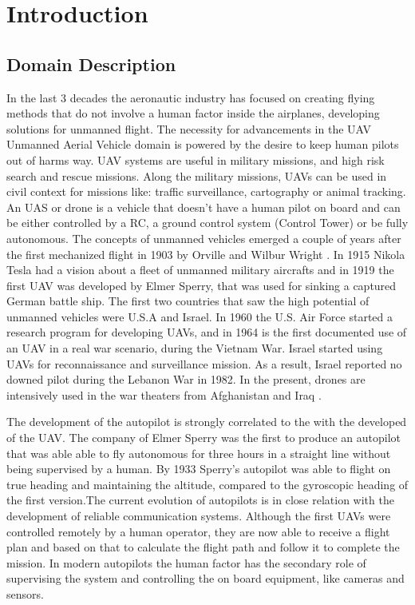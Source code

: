 \chapter{Introduction}
\label{chapter:intro}

\section{Domain Description}
\label{sec:domain}
In the last 3 decades the aeronautic industry has focused on creating flying methods 
that do not involve a human factor inside the airplanes, developing
solutions for unmanned flight. The necessity for advancements in the UAV
{Unmanned Aerial Vehicle} domain is powered by the desire to keep human pilots 
out of harms way. UAV systems are useful in military missions, and high risk 
search and rescue missions. Along the military missions, UAVs can be used in 
civil context for missions like: traffic surveillance, cartography or animal 
tracking. An UAS or drone is a vehicle that doesn't have
a human pilot on board and can be either controlled by a RC, 
a ground control system (Control Tower) or be fully autonomous. The concepts of 
unmanned vehicles emerged a couple of years after the first mechanized flight
in 1903 by Orville and Wilbur Wright \cite{learning-to-fly}. In 1915 Nikola
Tesla had a vision about a fleet of unmanned military aircrafts and in 1919 
the first UAV was developed by Elmer Sperry, that was used for sinking a captured
German battle ship. The first two countries that saw the high potential of unmanned vehicles were
U.S.A and Israel. In 1960 the U.S. Air Force started a research program for
developing UAVs,  and in 1964 is the first documented use of an UAV in a real
war scenario,  during the Vietnam War. Israel started using UAVs for 
reconnaissance and surveillance mission. As a result, Israel reported no downed 
pilot during the Lebanon War in 1982. In the present,  drones are intensively 
used in the war theaters from Afghanistan and Iraq \cite{eyes-of-the-army}.

The development of the autopilot is strongly correlated to the with the 
developed of the UAV. The company of Elmer Sperry was the first to produce
an autopilot that was able able to fly autonomous for three hours in a straight
line without being supervised by a human. By 1933 Sperry's autopilot was able to
flight on true heading and maintaining the altitude,  compared to the gyroscopic
heading of the first version.The current evolution of autopilots is in close relation with the development
of reliable communication systems. Although the first UAVs were controlled
remotely by a human operator,  they are now able to receive a flight plan
and based on that to calculate the flight path and follow it to complete the 
mission. In modern autopilots the human factor has the secondary role of supervising
the system and controlling the on board equipment, like cameras and sensors. 

